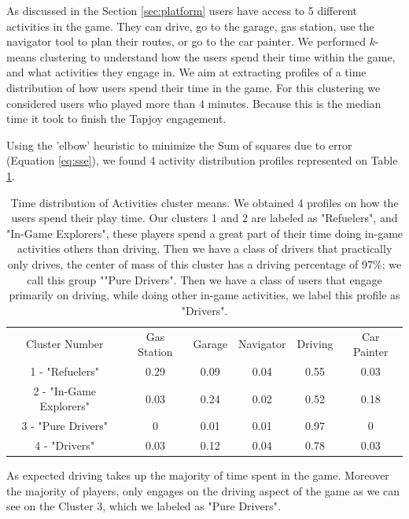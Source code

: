 \documentclass[preprint,authoryear,12pt]{elsarticle}
\begin{document}
As discussed in the Section \ref{sec:platform} users have access to 5 different activities in the game. They can drive, go to the garage, gas station, use the navigator tool to plan their routes, or go to the car painter. 
We performed $k$-means clustering to understand how the users spend their time within the game, and what activities they engage in. We aim at extracting profiles of a time distribution of how users spend their time in the game.
For this clustering we considered users who played more than 4 minutes. Because this is the median time it took to finish the Tapjoy engagement. 


Using the 'elbow' heuristic to minimize the Sum of squares due to error (Equation \ref{eq:sse}), we found 4 activity distribution profiles represented on Table \ref{T:cluster_activities}.  

\begin{table}[!h]
	\renewcommand*{\arraystretch}{1.2}
	\caption{Time distribution of Activities cluster means. We obtained 4 profiles on how the users spend their play time. Our clusters 1 and 2 are labeled as "Refuelers", and "In-Game Explorers", these players spend a great part of their time doing in-game activities others than driving. Then we have a class of drivers that practically only drives, the center of mass of this cluster has a driving percentage of 97\%; we call this group ""Pure Drivers". Then we have a class of users that engage primarily on driving, while doing other in-game activities, we label this profile as "Drivers".   }
	\begin{center}
		\begin{tabular}{c|c|c|c|c|c}
			Cluster Number	& Gas Station &	Garage &	Navigator &	Driving &	Car Painter 	\\
			1 - "Refuelers" &	0.29 &	0.09 &	0.04 &	0.55 &	0.03\\
			2 - "In-Game Explorers" &	0.03 &	0.24 &	0.02 &	0.52 &	0.18 \\
			3 - "Pure Drivers" &	0 &	0.01 &	0.01 &	0.97 &	0  \\
			4 - "Drivers" &	0.03 &	0.12 &	0.04 &	0.78 &	0.03   \\
		\end{tabular}
	\end{center}
	\label{T:cluster_activities}
\end{table}


As expected driving takes up the majority of time spent in the game. Moreover the majority of players, only engages on the driving aspect of the game as we can see on the Cluster 3, which we labeled as "Pure Drivers". 
\end{document}
